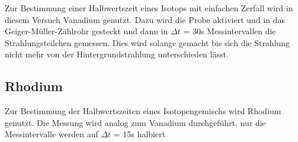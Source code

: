 \noindent Zur Bestimmung einer Halbwertszeit eines Isotops mit einfachen Zerfall wird in diesem Versuch Vanadium genutzt. Dazu wird die Probe aktiviert und 
in das Geiger-Müller-Zählrohr gesteckt und dann in $\Delta t$ = 30s Messintervallen die Strahlungsteilchen gemessen. Dies wird solange gemacht 
bis sich die Strahlung nicht mehr von der Hintergrundstrahlung unterschieden lässt.

\subsection{Rhodium}

\noindent Zur Bestimmung der Halbwertszeiten eines Isotopengemischs wird Rhodium genutzt. Die Messung wird analog zum Vanadium durchgeführt, 
nur die Messintervalle werden auf $\Delta t$ = 15s halbiert.